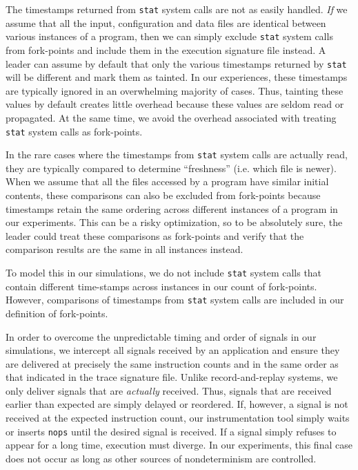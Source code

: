 The timestamps returned from
\texttt{stat} system calls
are not as easily handled. {\em If} we assume
that all the input, configuration
and data files are identical
between various instances of
a program, then we can 
simply exclude \texttt{stat}
system calls from fork-points
and include them 
in the execution signature file instead.
A leader can assume
by default that only the various timestamps
returned by \texttt{stat} will
be different and mark
them as tainted.
In our experiences,
these timestamps are typically
ignored in an overwhelming 
majority of cases. Thus, 
tainting these values by
default creates little overhead
because these values are seldom
read or propagated. At the same time,
we avoid the overhead associated
with treating \texttt{stat}
system calls as fork-points.

In the rare cases where
the timestamps from \texttt{stat}
system calls are actually read,
they are typically compared to
determine ``freshness''
(i.e. which file is newer).
When we assume that all
the files accessed by a program
have similar initial contents,
these comparisons can also
be excluded from 
fork-points because timestamps
retain the same ordering across different
instances of a program
in our experiments. This can be a risky
optimization, so to be absolutely sure, 
the leader could treat these comparisons as fork-points
and verify that the comparison results are the same
in all instances instead. 

To model this in our simulations, we do not include
\texttt{stat} system calls that contain
different time-stamps across instances in our
count of fork-points. However, comparisons of
timestamps from \texttt{stat} system
calls are included in our definition of fork-points.
\newline

 \newline
In order to overcome the unpredictable timing and 
order of signals in our simulations, we intercept all signals received by 
an application and ensure they are delivered
at precisely the same instruction counts
and in the same order as that indicated
in the trace signature file.
Unlike record-and-replay systems, we only
deliver signals that are {\em actually}
received. Thus, signals that are received earlier
than expected are simply delayed or reordered. If,
however, a signal is not received at the expected
instruction count, our instrumentation tool
simply waits or inserts \texttt{nops} until the 
desired signal is received. If a signal simply
refuses to appear for a long time, execution
must diverge. In our experiments,
this final case does not occur as long
as other sources of nondeterminism are controlled. 


